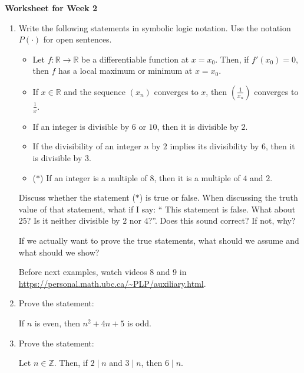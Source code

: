 \documentclass[12pt]{article}
\begin{document}
\centerline{\bf\large Worksheet for Week 2}

\vspace{25pt}


\begin{enumerate}

\item Write the following statements in symbolic logic notation. Use the notation $P(\cdot)$ for open sentences.

\begin{itemize}

\item {\color{red} Let $f:\mathbb R \to \mathbb R$ be a differentiable function at $x=x_0$. Then, if $f'(x_0)=0$, then $f$ has a local maximum or minimum at $x=x_0$}.

\item If $x\in\mathbb R$ and the sequence $(x_n)$ converges to $x$, then $(\frac{1}{x_n})$ converges to $\frac{1}{x}$.

\item {\color{red} If an integer is divisible by $6$ or $10$, then it is divisible by $2$}.

\item If the divisibility of an integer $n$ by $2$ implies its divisibility by $6$, then it is divisible by $3$.

\item {\color{red}($\ast$) If an integer is a multiple of $8$, then it is a multiple of $4$ and $2$}.

\end{itemize}

Discuss whether the statement ($\ast$) is true or false. When discussing the truth value of that statement, what if I say: `` This statement is false. What about $25$? Is it neither divisible by $2$ nor $4$?''. Does this sound correct? If not, why?

 If we actually want to prove the true statements, what should we assume and what should we show?
 
 Before next examples, watch videos 8 and 9 in \url{https://personal.math.ubc.ca/~PLP/auxiliary.html}.

\item  Prove the statement:
\begin{center}
If $n$ is even, then $n^2+4n+5$ is odd.
\end{center}


\item Prove the statement:
\begin{center}
Let $n\in\mathbb Z$. Then, if $2\mid n$ and $3\mid n$, then $6\mid n$.
\end{center}


\end{enumerate}
\end{document}
